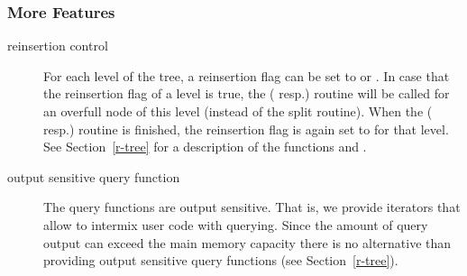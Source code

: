 \subsubsection{More Features}
\begin{description}
\item[reinsertion control]
For each level of the tree, a reinsertion flag can be set to  
or . In case that the reinsertion flag of a level is
true, the  ( resp.)
routine will be called for an overfull node of this level (instead 
of the split routine). When the 
( resp.) routine is finished, the
reinsertion flag is again set to  for that level.
See Section~\ref{r-tree} for a description 
of the functions  and .
\item[output sensitive query function]
The query functions are output sensitive. That is, we
provide iterators that allow to intermix user code with
querying. Since the amount of query output can exceed
the main memory capacity there is no alternative than providing
output sensitive query functions (see Section~\ref{r-tree}).
\end{description}



